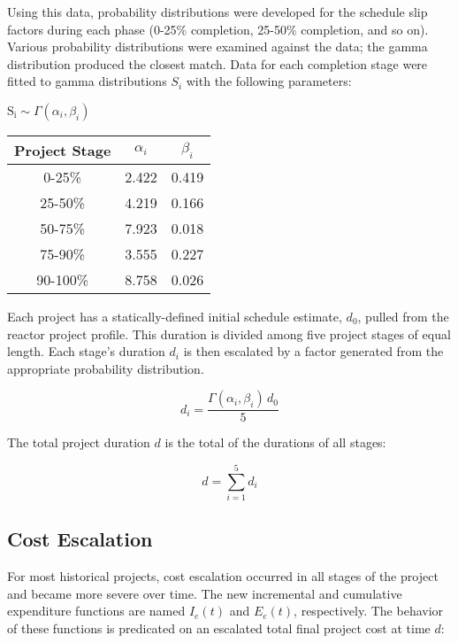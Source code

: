 \documentclass{article}
\begin{document}
Using this data, probability distributions were developed for the schedule slip factors during each phase (0-25\% completion, 25-50\% completion, and so on).
Various probability distributions were examined against the data; the gamma distribution produced the closest match.
Data for each completion stage were fitted to gamma distributions $S_i$ with the following parameters:

\begin{center}
$\mathrm{S_i} \sim \Gamma \left( \alpha_i, \beta_i \right)$\\
\begin{tabular} {| c | c | c |} \hline
  Project Stage & $\alpha_i$ & $\beta_i$ \\ \hline
  0-25\% & 2.422 & 0.419 \\ \hline
  25-50\% & 4.219 & 0.166 \\ \hline
  50-75\% & 7.923 & 0.018 \\ \hline
  75-90\% & 3.555 & 0.227 \\ \hline
  90-100\% & 8.758 & 0.026 \\ \hline
\end{tabular}
\end{center}

Each project has a statically-defined initial schedule estimate, $d_0$, pulled from the reactor project profile.
This duration is divided among five project stages of equal length.
Each stage's duration $d_i$ is then escalated by a factor generated from the appropriate probability distribution.

\begin{equation}
  d_i = \frac{\Gamma \left( \alpha_i, \beta_i \right) \, d_0}{5}
\end{equation}

The total project duration $d$ is the total of the durations of all stages:

\begin{equation}
  d = \sum_{i=1}^5 d_i
\end{equation}

\subsection{Cost Escalation}

For most historical projects, cost escalation occurred in all stages of the project and became more severe over time.
The new incremental and cumulative expenditure functions are named $I_e(t)$ and $E_e(t)$, respectively.
The behavior of these functions is predicated on an escalated total final project cost at time $d$:
\end{document}
